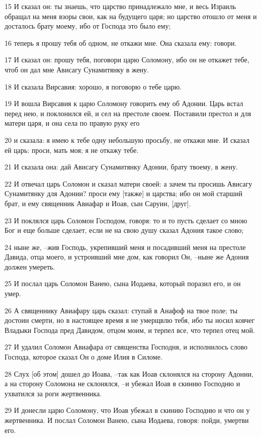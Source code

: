 \par 15 И сказал он: ты знаешь, что царство принадлежало мне, и весь Израиль обращал на меня взоры свои, как на будущего царя; но царство отошло от меня и досталось брату моему, ибо от Господа это было ему;
\par 16 теперь я прошу тебя об одном, не откажи мне. Она сказала ему: говори.
\par 17 И сказал он: прошу тебя, поговори царю Соломону, ибо он не откажет тебе, чтоб он дал мне Ависагу Сунамитянку в жену.
\par 18 И сказала Вирсавия: хорошо, я поговорю о тебе царю.
\par 19 И вошла Вирсавия к царю Соломону говорить ему об Адонии. Царь встал перед нею, и поклонился ей, и сел на престоле своем. Поставили престол и для матери царя, и она села по правую руку его
\par 20 и сказала: я имею к тебе одну небольшую просьбу, не откажи мне. И сказал ей царь: проси, мать моя; я не откажу тебе.
\par 21 И сказала она: дай Ависагу Сунамитянку Адонии, брату твоему, в жену.
\par 22 И отвечал царь Соломон и сказал матери своей: а зачем ты просишь Ависагу Сунамитянку для Адонии? проси ему [также] и царства; ибо он мой старший брат, и ему священник Авиафар и Иоав, сын Саруин, [друг].
\par 23 И поклялся царь Соломон Господом, говоря: то и то пусть сделает со мною Бог и еще больше сделает, если не на свою душу сказал Адония такое слово;
\par 24 ныне же, --жив Господь, укрепивший меня и посадивший меня на престоле Давида, отца моего, и устроивший мне дом, как говорил Он, --ныне же Адония должен умереть.
\par 25 И послал царь Соломон Ванею, сына Иодаева, который поразил его, и он умер.
\par 26 А священнику Авиафару царь сказал: ступай в Анафоф на твое поле; ты достоин смерти, но в настоящее время я не умерщвлю тебя, ибо ты носил ковчег Владыки Господа пред Давидом, отцом моим, и терпел все, что терпел отец мой.
\par 27 И удалил Соломон Авиафара от священства Господня, и исполнилось слово Господа, которое сказал Он о доме Илия в Силоме.
\par 28 Слух [об этом] дошел до Иоава, --так как Иоав склонялся на сторону Адонии, а на сторону Соломона не склонялся, --и убежал Иоав в скинию Господню и ухватился за роги жертвенника.
\par 29 И донесли царю Соломону, что Иоав убежал в скинию Господню и что он у жертвенника. И послал Соломон Ванею, сына Иодаева, говоря: пойди, умертви его.
